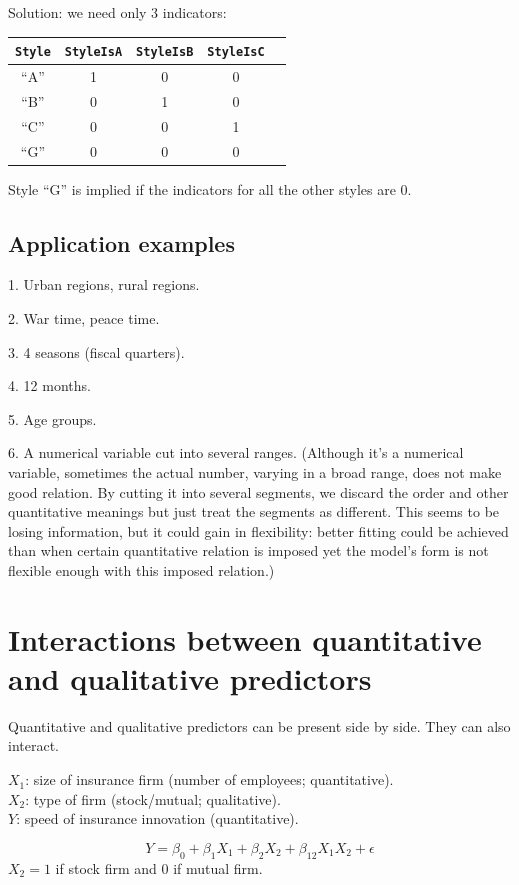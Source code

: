 \documentclass[12pt]{article}
\begin{document}
Solution: we need only 3 indicators:

\begin{tabular}{c|cccc}
\verb+Style+ & \verb+StyleIsA+ & \verb+StyleIsB+ & \verb+StyleIsC+ \\ \hline
``A'' & 1 & 0 & 0 \\
``B'' & 0 & 1 & 0 \\
``C'' & 0 & 0 & 1 \\
``G'' & 0 & 0 & 0 \\ \hline
\end{tabular}

Style ``G'' is implied if the indicators for all the other styles are 0.


\subsection{Application examples}

1. Urban regions, rural regions.

2. War time, peace time.

3. 4 seasons (fiscal quarters).

4. 12 months.

5. Age groups.

6. A numerical variable cut into several ranges.
(Although it's a numerical variable, sometimes the actual number,
varying in a broad range, does not make good relation.
By cutting it into several segments, we discard the order
and other quantitative meanings but just treat the segments as
different. This seems to be losing information, but it could gain
in flexibility: better fitting could be achieved
than when certain quantitative relation is imposed yet
the model's form is not flexible enough
with this imposed relation.)


\section{Interactions between quantitative and qualitative predictors}

Quantitative and qualitative predictors can be present side by side.
They can also interact.

\example
$X_1$: size of insurance firm (number of employees; quantitative).\\
$X_2$: type of firm (stock/mutual; qualitative).\\
$Y$: speed of insurance innovation (quantitative).

\[
Y = \beta_0 + \beta_1 X_1 + \beta_2 X_2 + \beta_{12}X_1X_2 + \epsilon
\]
$X_2 = 1$ if stock firm and 0 if mutual firm.
\end{document}
